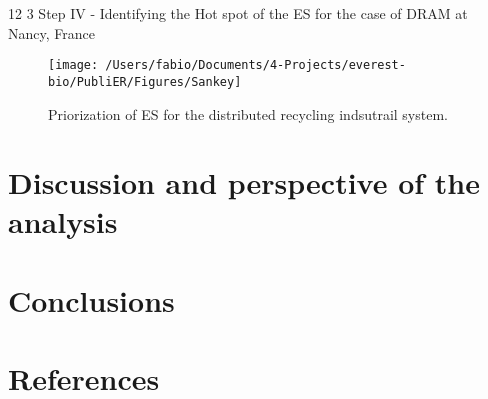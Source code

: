 \documentclass[]{elsarticle} %
\makeatletter
\renewcommand\subsection{\@startsection{subsection}{2}{\z@}%
         {12\p@ \@plus 6\p@ \@minus 3\p@}%
         {3\p@ \@plus 6\p@ \@minus 3\p@}%
         {\normalfont\normalsize\itshape\bfseries}}
\makeatother
\begin{document}
\hypertarget{step-iv---identifying-the-hot-spot-of-the-es-for-the-case-of-dram-at-nancy-france}{%
\subsection{Step IV - Identifying the Hot spot of the ES for the case of DRAM at Nancy, France}\label{step-iv---identifying-the-hot-spot-of-the-es-for-the-case-of-dram-at-nancy-france}}

\begin{landscape}
\begin{figure}

{\centering \texttt{[image: /Users/fabio/Documents/4-Projects/everest-bio/PubliER/Figures/Sankey]} 

}

\caption{Priorization of ES for the distributed recycling indsutrail system.}\label{fig:fig-sankey}
\end{figure}
\end{landscape}

\hypertarget{discussion-and-perspective-of-the-analysis}{%
\section{Discussion and perspective of the analysis}\label{discussion-and-perspective-of-the-analysis}}

\hypertarget{conclusions}{%
\section{Conclusions}\label{conclusions}}



\newpage

\hypertarget{references}{%
\section*{References}\label{references}}
\end{document}
